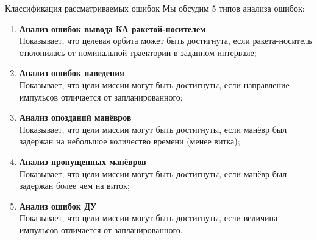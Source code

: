 \documentclass[8pt]{beamer}
\begin{document}
\begin{frame}{Классификация рассматриваемых ошибок}
Мы обсудим 5 типов анализа ошибок:
\begin{enumerate}
    \item \textbf{Анализ ошибок вывода КА ракетой-носителем} \\
    Показывает, что целевая орбита может быть достигнута, если ракета-носитель отклонилась от номинальной траектории в заданном интервале;

    \item \textbf{Анализ ошибок наведения} \\
    Показывает, что цели миссии могут быть достигнуты, если направление импульсов отличается от запланированного;

    \item \textbf{Анализ опозданий манёвров} \\
    Показывает, что цели миссии могут быть достигнуты, если манёвр был задержан на небольшое количество времени (менее витка);

    \item \textbf{Анализ пропущенных манёвров} \\
    Показывает, что цели миссии могут быть достигнуты, если манёвр был задержан более чем на виток;

    \item \textbf{Анализ ошибок ДУ} \\
    Показывает, что цели миссии могут быть достигнуты, если величина импульсов отличается от запланированного.
    
\end{enumerate}
\end{frame}
\end{document}
